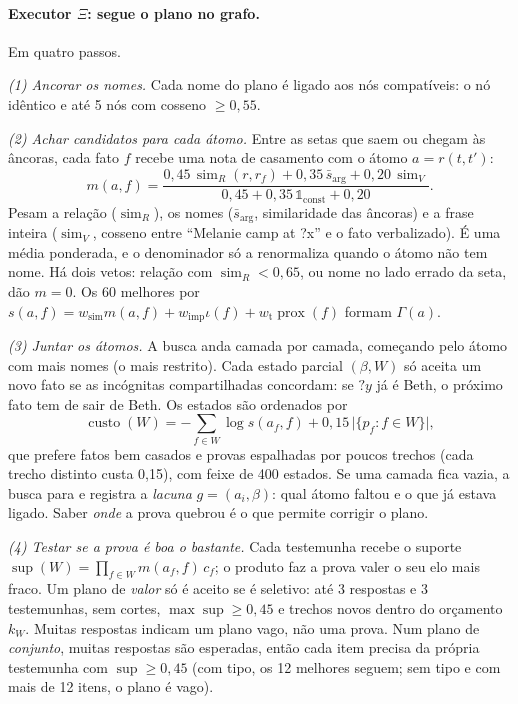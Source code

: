 \documentclass[10pt,twocolumn]{article}
\theoremstyle{definition}
\newcommand{\V}[1]{\mathord{?}\mathit{#1}}
\newcommand{\sem}{\operatorname{sim}}
\newcommand{\prox}{\operatorname{prox}}
\DeclareMathOperator{\cost}{custo}
\DeclareMathOperator{\supp}{sup}
\begin{document}
\paragraph{Executor $\Xi$: segue o plano no grafo.} Em quatro passos.

\emph{(1) Ancorar os nomes.} Cada nome do plano é ligado aos nós
compatíveis: o nó idêntico e até 5 nós com cosseno $\ge0{,}55$.

\emph{(2) Achar candidatos para cada átomo.} Entre as setas que saem ou chegam
às âncoras, cada fato $f$ recebe uma nota de casamento com o átomo $a=r(t,t')$:
\begin{equation}\label{eq:match}
m(a,f)=\frac{0{,}45\,\sem_R(r,r_f)+0{,}35\,\bar s_{\text{arg}}+0{,}20\,\sem_V}{0{,}45+0{,}35\,\mathbb 1_{\text{const}}+0{,}20}.
\end{equation}
Pesam a relação ($\sem_R$), os nomes ($\bar s_{\text{arg}}$, similaridade das
âncoras) e a frase inteira ($\sem_V$, cosseno entre ``Melanie camp at ?x'' e
o fato verbalizado). É uma média ponderada, e o denominador só a renormaliza
quando o átomo não tem nome. Há dois vetos: relação com $\sem_R<0{,}65$, ou
nome no lado errado da seta, dão $m=0$. Os 60 melhores por
$s(a,f)=w_{\text{sim}}m(a,f)+w_{\text{imp}}\iota(f)+w_{\text{t}}\prox(f)$
formam $\Gamma(a)$.

\emph{(3) Juntar os átomos.} A busca anda camada por camada, começando pelo
átomo com mais nomes (o mais restrito). Cada estado parcial $(\beta,W)$ só
aceita um novo fato se as incógnitas compartilhadas concordam: se $\V y$ já é
Beth, o próximo fato tem de sair de Beth. Os estados são ordenados por
\begin{equation}\label{eq:cost}
\cost(W)=-\textstyle\sum_{f\in W}\log s(a_f,f)+0{,}15\,\big|\{p_f:f\in W\}\big|,
\end{equation}
que prefere fatos bem casados e provas espalhadas por poucos trechos (cada
trecho distinto custa 0{,}15), com feixe de 400 estados. Se uma camada fica
vazia, a busca para e registra a \emph{lacuna} $g=(a_i,\beta)$: qual átomo
faltou e o que já estava ligado. Saber \emph{onde} a prova quebrou é o que
permite corrigir o plano.

\emph{(4) Testar se a prova é boa o bastante.} Cada testemunha recebe o
suporte $\supp(W)=\prod_{f\in W}m(a_f,f)\,c_f$; o produto faz a prova valer o
seu elo mais fraco. Um plano de \emph{valor} só é aceito se é seletivo: até 3
respostas e 3 testemunhas, sem cortes, $\max\supp\ge0{,}45$ e trechos novos
dentro do orçamento $k_W$. Muitas respostas indicam um plano vago, não uma
prova. Num plano de \emph{conjunto}, muitas respostas são esperadas, então
cada item precisa da própria testemunha com $\supp\ge0{,}45$ (com tipo, os 12
melhores seguem; sem tipo e com mais de 12 itens, o plano é vago).
\end{document}
